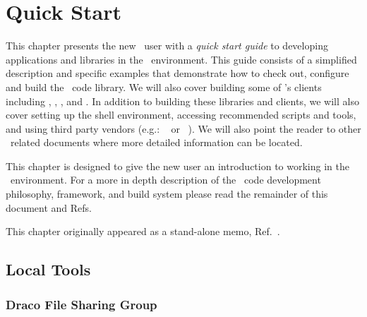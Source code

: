 
\newcommand{\wedgehog}{\sys{Wedgehog}}
\newcommand{\jayenne}{\sys{Jayenne}}
\newcommand{\gsl}{\soft{GSL}}
\newcommand{\openmpi}{\soft{OpenMPI}}
\newcommand{\emacs}{\soft{Emacs}}
\newcommand{\bash}{\soft{bash}}

\chapter{Quick Start}
\label{chap:quickstart}

This chapter presents the new \draco\ user with a
\emph{quick start guide} to developing applications and libraries in
the \draco\ environment.  This guide consists of a simplified
description and specific examples that demonstrate how to check out,
configure and build the \draco\ code library.  We will
also cover building some of \draco's clients including \clubimc,
\wedgehog, \milagro, and \capsaicin.  In addition to building these
libraries and clients, we will also cover setting up the shell
environment, accessing recommended scripts and tools, and using third
party vendors (e.g.: \gsl~\cite{gslref} or
\openmpi~\cite{openmpiweb}).  We will also point the reader to other
\draco\ related documents where more detailed information can be
located.

This chapter is designed to give the new user an introduction to
working in the \draco\ environment.  For a more in depth description
of the \draco\ code development philosophy, framework, and build
system please read the remainder of this document and Refs.~\cite{rn98046,draco-build,xtm:9909,doxygen,draco-purify,ccs-4:04-35,ccs-2:12-04}

This chapter originally appeared as a stand-alone memo, Ref.~\cite{ccs2:12-16}.


\section{Local Tools}

\subsection{Draco File Sharing Group}


